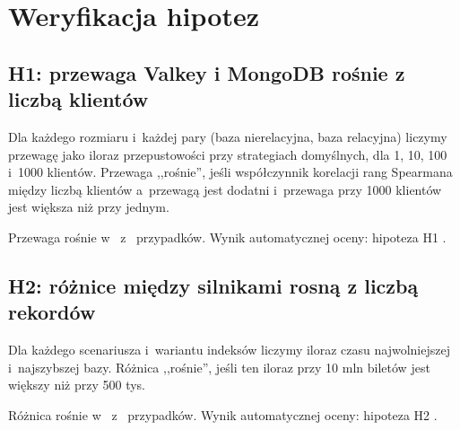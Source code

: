 \section{Weryfikacja hipotez}
\label{sec:hipotezy}

\subsection{H1: przewaga Valkey i MongoDB rośnie z liczbą klientów}

Dla każdego rozmiaru i~każdej pary (baza nierelacyjna, baza relacyjna)
liczymy przewagę jako iloraz przepustowości przy strategiach domyślnych, dla
1, 10, 100 i~1000 klientów. Przewaga ,,rośnie'', jeśli współczynnik korelacji
rang Spearmana między liczbą klientów a~przewagą jest dodatni i~przewaga przy
1000 klientów jest większa niż przy jednym.

\begin{table}[H]
\centering
\caption{H1: przewaga przepustowości (iloraz) przy 1 i~przy 1000 klientach.}
\label{tab:h1}
\small
{}
\end{table}

Przewaga rośnie w~\HOneGrows{} z~\HOneCases{} przypadków. Wynik
automatycznej oceny: hipoteza H1 \textbf{\HOneVerdict}.



\subsection{H2: różnice między silnikami rosną z liczbą rekordów}

Dla każdego scenariusza i~wariantu indeksów liczymy iloraz czasu
najwolniejszej i~najszybszej bazy. Różnica ,,rośnie'', jeśli ten iloraz przy
10 mln biletów jest większy niż przy 500 tys.

\begin{table}[H]
\centering
\caption{H2: iloraz czasu najwolniejszej i~najszybszej bazy.}
\label{tab:h2}
\footnotesize
{}
\end{table}

Różnica rośnie w~\HTwoGrows{} z~\HTwoCases{} przypadków. Wynik automatycznej
oceny: hipoteza H2 \textbf{\HTwoVerdict}.


